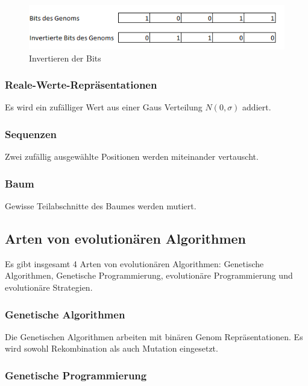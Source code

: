         \begin{figure}[H]
          \includegraphics[scale=1, center]{graphics/mutation_binary_flip}
          \caption{Invertieren der Bits \label{fig:mutation_binary_flip}}
        \end{figure}

      \subsubsection{Reale-Werte-Repräsentationen}

        Es wird ein zufälliger Wert aus einer Gaus Verteilung \(N(0,\sigma)\) addiert.

      \subsubsection{Sequenzen}

        Zwei zufällig ausgewählte Positionen werden miteinander vertauscht.

      \subsubsection{Baum}

        Gewisse Teilabschnitte des Baumes werden mutiert.


  \subsection{Arten von evolutionären Algorithmen\label{sub:artenEvAlgos}}

    Es gibt insgesamt 4 Arten von evolutionären Algorithmen:
    Genetische Algorithmen, Genetische Programmierung, evolutionäre Programmierung
    und evolutionäre Strategien.

    \subsubsection{Genetische Algorithmen\label{item:genAlgo}}

      Die Genetischen Algorithmen arbeiten mit binären Genom Repräsentationen.
      Es wird sowohl Rekombination als auch Mutation eingesetzt.

    \subsubsection{Genetische Programmierung\label{item:genProg}}

